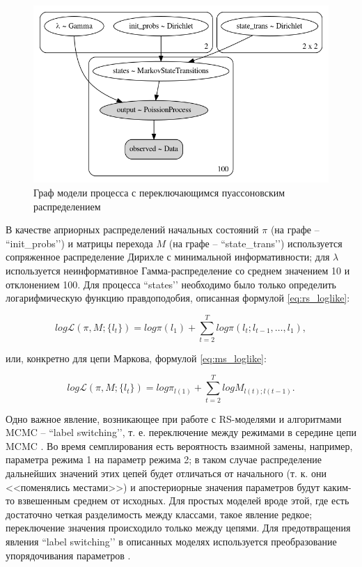 \documentclass[a4paper,14pt]{extreport}
\begin{document}
\begin{figure}[H]
	\includegraphics[width=\linewidth]{img/gen/pp_ms_pois_graph.png}
	\caption{Граф модели процесса с переключающимся пуассоновским распределением}
	\label{fig:pp_ms_pois_graph}
\end{figure}

В качестве априорных распределений начальных состояний $\pi$ (на графе -- ``init\_probs’’) и матрицы перехода $M$ (на графе -- ``state\_trans’’) используется сопряженное распределение Дирихле с минимальной информативности; для $\lambda$ используется неинформативное Гамма-распределение со среднем значением 10 и отклонением 100. Для процесса ``states’’ необходимо было только определить логарифмическую функцию правдоподобия, описанная формулой \eqref{eq:rs_loglike}:

\begin{equation}
	\mathit{log}\mathcal{L}(\pi, M; \{l_t\})
	=
	\mathit{log}\pi(l_1) + 
	\sum\limits_{t=2}^{T}{ 
	\mathit{log}\pi(l_t; l_{t-1}, \dots, l_1)
	} ,
	\label{eq:rs_loglike}
\end{equation}

\noindent
или, конкретно для цепи Маркова, формулой \eqref{eq:ms_loglike}:

\begin{equation}
	\mathit{log}\mathcal{L}(\pi, M; \{l_t\})
	=
	\mathit{log} \pi_{l(1)} + 
	\sum\limits_{t=2}^{T}{ 
	\mathit{log} M_{l(t); l(t-1)}
	} .
	\label{eq:ms_loglike}
\end{equation}

Одно важное явление, возникающее при работе с RS-моделями и алгоритмами MCMC – ``label switching’’, т. е. переключение между режимами в середине цепи MCMC \cite{stan_user_guide,blog_hidden_markov_ravinutala}. Во время семплирования есть вероятность взаимной замены, например, параметра режима 1 на параметр режима 2; в таком случае распределение дальнейших значений этих цепей будет отличаться от начального (т. к. они <<поменялись местами>>) и апостериорные значения параметров будут каким-то взвешенным среднем от исходных. Для простых моделей вроде этой, где есть достаточно четкая разделимость между классами, такое явление редкое; переключение значения происходило только между цепями. Для предотвращения явления ``label switching’’ в описанных моделях используется преобразование упорядочивания параметров \cite{blog_hidden_markov_ravinutala}.
\end{document}
